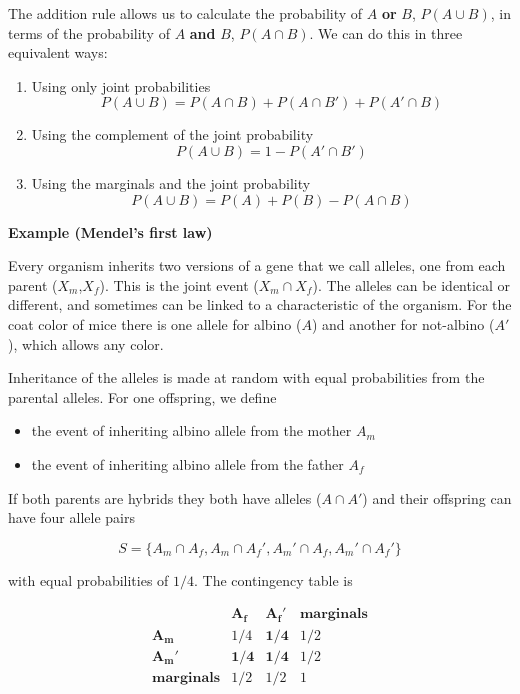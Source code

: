 \documentclass[
]{book}
\begin{document}
The addition rule allows us to calculate the probability of \(A\) \textbf{or} \(B\), \(P( A \cup B)\), in terms of the probability of \(A\) \textbf{and} \(B\), \(P(A \cap B )\). We can do this in three equivalent ways:

\begin{enumerate}
\def\labelenumi{\arabic{enumi})}
\item
  Using only joint probabilities
  \[P( A \cup B)=P(A \cap B)+P(A\cap B')+P(A'\cap B)\]
\item
  Using the complement of the joint probability
  \[P(A \cup B)=1-P(A'\cap B')\]
\item
  Using the marginals and the joint probability
  \[P(A \cup B)=P(A) + P(B) - P(A\cap B)\]
\end{enumerate}

\textbf{Example (Mendel's first law)}

Every organism inherits two versions of a gene that we call alleles, one from each parent (\(X_m\),\(X_f\)). This is the joint event (\(X_m \cap X_f\)). The alleles can be identical or different, and sometimes can be linked to a characteristic of the organism. For the coat color of mice there is one allele for albino (\(A\)) and another for not-albino (\(A'\)), which allows any color.

Inheritance of the alleles is made at random with equal probabilities from the parental alleles. For one offspring, we define

\begin{itemize}
\item
  the event of inheriting albino allele from the mother \(A_m\)
\item
  the event of inheriting albino allele from the father \(A_f\)
\end{itemize}

If both parents are hybrids they both have alleles (\(A \cap A'\)) and their offspring can have four allele pairs

\[S =\{A_m \cap A_f,  A_m \cap A_f', A_m' \cap A_f, A_m' \cap A_f'\}\]

with equal probabilities of \(1/4\). The contingency table is

\[
\begin{array}{ccc|c}
                   & \mathbf{A_f}   & \mathbf{A_f'} & \mathbf{marginals} \\ 
\mathbf{A_m}       & 1/4   & \mathbf{1/4}  & 1/2                \\ 
\mathbf{A_m'}      & \mathbf{1/4}   & \mathbf{1/4}           & 1/2                 \\ \hline
\mathbf{marginals} & 1/2            & 1/2           & 1                   \\ 
\end{array}
\]
\end{document}
